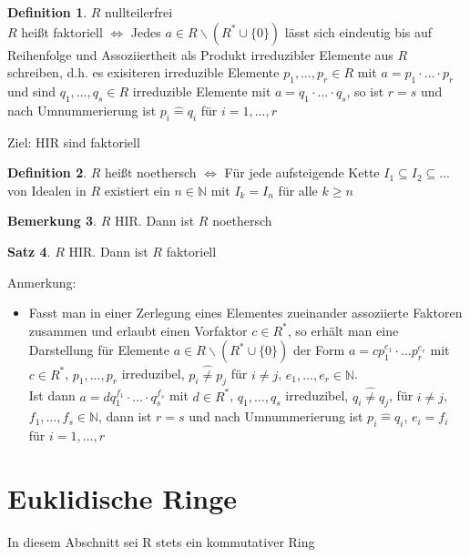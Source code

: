 \documentclass[10pt,a4paper,numbers=endperiod]{scrartcl}
\theoremstyle{definition}
\newtheorem{satz}{Satz}[section]
\newtheorem{defi}[satz]{Definition}
\newtheorem{bem}[satz]{Bemerkung}
\def\NN{{\mathbb N}}
\begin{document}
\begin{defi}
	$R$ nullteilerfrei\\
	$R$ heißt faktoriell $\Leftrightarrow$ Jedes $a \in R \backslash (R^* \cup \{0\})$ lässt sich eindeutig bis auf Reihenfolge und Assoziiertheit als Produkt irreduzibler Elemente aus $R$ schreiben, d.h. es exisiteren irreduzible Elemente $p_1, \ldots, p_r \in R$ mit $a = p_1 \cdot \ldots \cdot p_r$ und sind $q_1, \ldots, q_s \in R$ irreduzible Elemente mit $a = q_1 \cdot \ldots \cdot q_s$, so ist $r = s$ und nach Umnummerierung ist $p_i \hat{=} q_i$ für $i = 1, \ldots, r$
\end{defi}

Ziel: HIR sind faktoriell

\begin{defi}
	$R$ heißt noethersch $\Leftrightarrow$ Für jede aufsteigende Kette $I_1 \subseteq I_2 \subseteq...$ von Idealen in $R$ existiert ein $n \in \NN$ mit $I_k = I_n$ für alle $k \geq n$ 
\end{defi}

\begin{bem}
	$R$ HIR. Dann ist $R$ noethersch
\end{bem}

\begin{satz}
	$R$ HIR. Dann ist $R$ faktoriell
\end{satz}

Anmerkung: \begin{itemize}
	\item Fasst man in einer Zerlegung eines Elementes zueinander assoziierte Faktoren zusammen und erlaubt einen Vorfaktor $c \in R^*$, so erhält man eine Darstellung für Elemente $a \in R \backslash (R^* \cup \{0\})$ der Form $a = cp_1^{e_1} \cdot \ldots p_r^{e_r}$ mit $c \in R^*$, $p_1, \ldots, p_r$ irreduzibel, $p_i \hat{\neq} p_j$ für $i \neq j$, $e_1, \ldots, e_r \in \NN$.\\
	Ist dann $ a= dq_1^{f_1} \cdot \ldots \cdot q_s^{f_s}$ mit $d \in R^*$, $q_1, \ldots, q_s$ irreduzibel, $q_i \hat{\neq} q_j$, für $i \neq j$, $f_1, \ldots, f_s \in \NN$, dann ist $r = s$ und nach Umnummerierung ist $p_i \hat{=} q_i$, $e_i = f_i$ für $i = 1, \ldots, r$
\end{itemize}
\newpage
\section{Euklidische Ringe}

In diesem Abschnitt sei R stets ein kommutativer Ring
\end{document}
